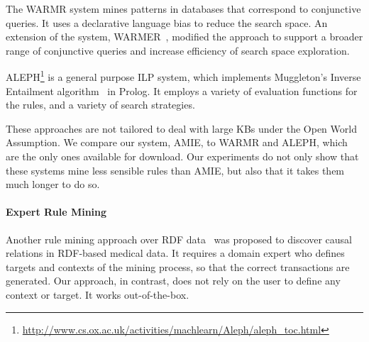 The WARMR system \cite{DehToi99,DehToi00} mines patterns in databases that correspond to conjunctive queries. It uses a declarative language bias to reduce the search space. 
An extension of the system, WARMER~\cite{GoeVan02}, modified the approach to support a broader range of conjunctive queries and increase efficiency of search space exploration. 

ALEPH\footnote{\label{foot:aleph}\url{http://www.cs.ox.ac.uk/activities/machlearn/Aleph/aleph_toc.html}} is a general purpose ILP system, 
which implements Muggleton's Inverse Entailment algorithm~\cite{Muggleton95inverseentailment} in Prolog. 
It employs a variety of evaluation functions for the rules, and a variety of search strategies. 

These approaches are not tailored to deal with large KBs under the Open World Assumption. 
We compare our system, AMIE, to WARMR and ALEPH, which are the only ones available for download. 
Our experiments do not only show that these systems mine less sensible rules than AMIE, but also that it takes them much longer to do so. 


\paragraph{Expert Rule Mining}
Another rule mining approach over RDF data~\cite{NebBer12} was proposed to discover causal relations in RDF-based medical data. 
It requires a domain expert who defines targets and contexts of the mining process, so that the correct transactions are generated.
Our approach, in contrast, does not rely on the user to define any context or target. It works out-of-the-box.



